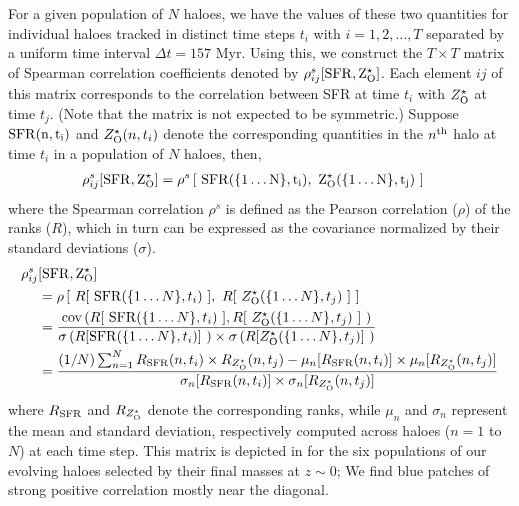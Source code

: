 For a given population of $N$ haloes, we have the values of these two quantities for individual haloes tracked in distinct time steps $t_i$ with $i=1,2,\ldots,T$ separated by a uniform time interval $\Delta t = 157$ Myr. Using this, we construct the $T \times T$ matrix of Spearman correlation coefficients denoted by $\rho^s_{ij} [ \rm{SFR}, Z^{\star}_{\rm{O}}]$. Each element $ij$ of this matrix corresponds to the correlation between SFR at time $t_i$ with $Z^{\star}_{\rm{O}}$ at time $t_j$. (Note that the matrix is not expected to be symmetric.) Suppose $\rm{SFR}(n,t_i)$ and $Z^{\star}_{\rm{O}}(n,t_i)$ denote the corresponding quantities in the $n^{\rm{th}}$ halo at time $t_i$ in a population of $N$ haloes, then,
% 
\begin{align}
\rho^s_{ij} [\rm{SFR}, Z^{\star}_{\rm{O}}] &= \rho^s \left[~\rm{SFR}(\{1 \ldots N\},t_i), ~Z^{\star}_{\rm{O}}(\{1 \ldots N\},t_j)~\right] 
\end{align}
where the Spearman correlation $\rho^s$ is defined as the Pearson correlation ($\rho$) of the ranks ($R$), which in turn can be expressed as the covariance normalized by their standard deviations ($\sigma$).
\begin{align}
\rho^s_{ij} &[\rm{SFR}, Z^{\star}_{\rm{O}}] \\
&= \rho \left[~R[~{\rm{SFR}}(\{1 \ldots N\},t_i)~], ~R[~Z^{\star}_{\rm{O}}(\{1 \ldots N\},t_j)~]~\right]\\
&= \frac{\text{cov}\left(R[~{\rm{SFR}}(\{1 \ldots N\},t_i)~], R[~Z^{\star}_{\rm{O}}(\{1 \ldots N\},t_j)~]~\right)}{\sigma\left(R[{\rm{SFR}}(\{1 \ldots N\},t_i)]~\right) \times \sigma\left(R[Z^{\star}_{\rm{O}}(\{1 \ldots N\},t_j)]~\right)}\\
&= \frac{  (1/N) \sum_{n=1}^{N} R_{\rm{SFR}}(n,t_i) \times  R_{Z^{\star}_{\rm{O}}}(n,t_j) - \mu_{n} [ R_{\rm{SFR}}(n,t_i) ]  \times \mu_{n} [R_{Z^{\star}_{\rm{O}}}(n,t_j)] }
{ \sigma_{n} [ R_{\rm{SFR}}(n,t_i) ]  \times \sigma_{n} [R_{Z^{\star}_{\rm{O}}}(n,t_j)] }
\end{align}
% 
where $R_{\rm{SFR}}$ and $R_{Z^{\star}_{\rm{O}}}$ denote the corresponding ranks, while $\mu_n$ and $\sigma_n$ represent the mean and standard deviation, respectively computed across haloes ($n=1$ to $N$) at each time step. This matrix is depicted in  for the six populations of our evolving haloes selected by their final masses at $z \sim 0$; We find blue patches of strong positive correlation mostly near the diagonal. 

